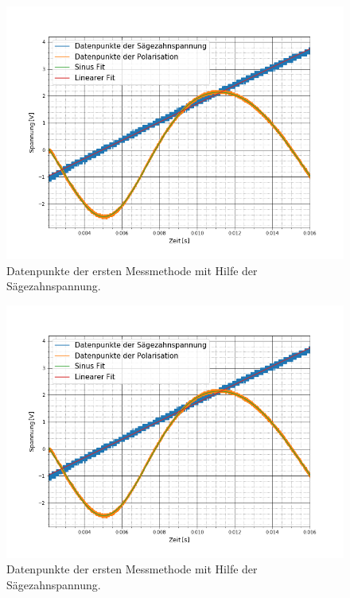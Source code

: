 \begin{figure}[ht]
	\includegraphics[scale=0.5]{Bild/V1_11}
	\centering
	\caption[Plot zu Versuchsteil 1 Nr.11]{Datenpunkte der ersten Messmethode mit Hilfe der Sägezahnspannung.}
\end{figure}
\begin{figure}[ht]
	\includegraphics[scale=0.5]{Bild/V1_12}
	\centering
	\caption[Plot zu Versuchsteil 1 Nr.12]{Datenpunkte der ersten Messmethode mit Hilfe der Sägezahnspannung.}
\end{figure}
